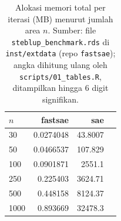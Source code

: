 \begin{table}[htbp]
\centering
\caption{Alokasi memori total per iterasi (MB) menurut jumlah area $n$. Sumber: file \texttt{steblup\_benchmark.rds} di \texttt{inst/extdata} (repo \texttt{fastsae}); angka dihitung ulang oleh \texttt{scripts/01\_tables.R}, ditampilkan hingga 6 digit signifikan.}
\label{tab:mem-stfh}
\small
\begin{tabular}{lrrr}
\toprule
$n$ & fastsae & sae \\
\midrule
30 & 0.0274048 & 43.8007 \\
50 & 0.0466537 & 107.829 \\
100 & 0.0901871 &  2551.1 \\
250 & 0.225403 & 3624.71 \\
500 & 0.448158 & 8124.37 \\
1000 & 0.893669 & 32478.3 \\
\bottomrule
\end{tabular}
\end{table}

